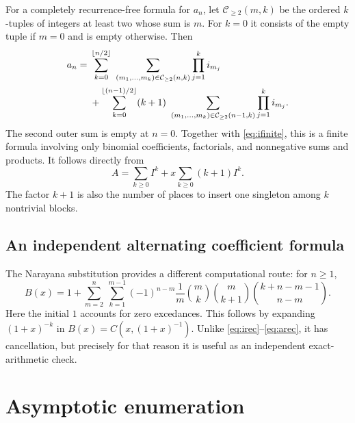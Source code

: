 \documentclass[11pt,letterpaper]{article}
\numberwithin{equation}{section}
\theoremstyle{definition}
\newcommand{\coeff}[2]{[#1^{#2}]}
\begin{document}
For a completely recurrence-free formula for $a_n$, let
$\mathcal C_{\ge2}(m,k)$ be the ordered $k$-tuples of integers at least
two whose sum is $m$. For $k=0$ it consists of the empty tuple if $m=0$
and is empty otherwise. Then
\begin{align}
 a_n={}&\sum_{k=0}^{\lfloor n/2\rfloor}
       \ \sum_{(m_1,\ldots,m_k)\in\mathcal C_{\ge2}(n,k)}
                \prod_{j=1}^k i_{m_j}\notag\\
 &+\sum_{k=0}^{\lfloor(n-1)/2\rfloor}(k+1)
       \ \sum_{(m_1,\ldots,m_k)\in\mathcal C_{\ge2}(n-1,k)}
                \prod_{j=1}^k i_{m_j}.
 \label{eq:afinite}
\end{align}
The second outer sum is empty at $n=0$. Together with \eqref{eq:ifinite},
this is a finite formula involving only binomial coefficients, factorials,
and nonnegative sums and products. It follows directly from
\[
 A=\sum_{k\ge0}I^k+x\sum_{k\ge0}(k+1)I^k.
\]
The factor $k+1$ is also the number of places to insert one singleton
among $k$ nontrivial blocks.

\subsection{An independent alternating coefficient formula}

The Narayana substitution provides a different computational route:
for $n\ge1$,
\begin{equation}
 \coeff{x}{n}B(x)
 =1+\sum_{m=2}^{n}\ \sum_{k=1}^{m-1}
       (-1)^{n-m}\frac1m\binom mk\binom m{k+1}
                  \binom{k+n-m-1}{n-m}.
 \label{eq:Bfinite}
\end{equation}
Here the initial $1$ accounts for zero excedances. This follows by
expanding $(1+x)^{-k}$ in $B(x)=C(x,(1+x)^{-1})$.
Unlike \eqref{eq:irec}--\eqref{eq:arec}, it has cancellation, but precisely
for that reason it is useful as an independent exact-arithmetic check.

\section{Asymptotic enumeration}
\label{sec:asymptotics}
\end{document}
